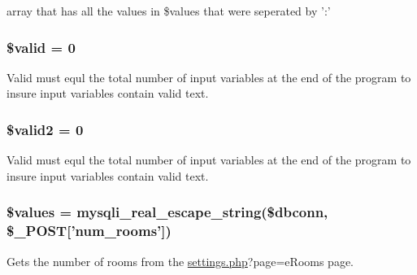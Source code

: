 array that has all the values in \$values that were seperated by '\-:' \hypertarget{upRooms_8php_a0587674d27d00ef497e08e53ccf45bbb}{
\subsubsection[{\$valid}]{\setlength{\rightskip}{0pt plus 5cm}\$valid = 0}}\label{upRooms_8php_a0587674d27d00ef497e08e53ccf45bbb}
\-Valid must equl the total number of input variables at the end of the program to insure input variables contain valid text. \hypertarget{upRooms_8php_abe127179a308dc005af960bb7cd17739}{
\subsubsection[{\$valid2}]{\setlength{\rightskip}{0pt plus 5cm}\$valid2 = 0}}\label{upRooms_8php_abe127179a308dc005af960bb7cd17739}
\-Valid must equl the total number of input variables at the end of the program to insure input variables contain valid text. \hypertarget{upRooms_8php_affc45c6ace2eeb3f300b054dbf9592b6}{
\subsubsection[{\$values}]{\setlength{\rightskip}{0pt plus 5cm}\$values = mysqli\-\_\-real\-\_\-escape\-\_\-string(\$dbconn, \$\-\_\-\-P\-O\-S\-T\mbox{[}'num\-\_\-rooms'\mbox{]})}}\label{upRooms_8php_affc45c6ace2eeb3f300b054dbf9592b6}
\-Gets the number of rooms from the \hyperlink{settings_8php}{settings.\-php}?page=e\-Rooms page. 